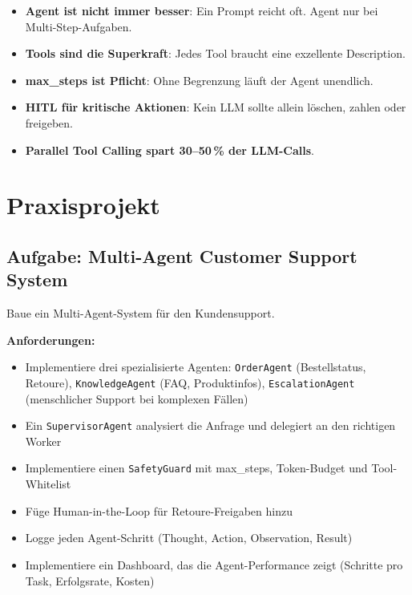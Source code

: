 


\par\mbox{}\par
\begin{merkeEnv}
\begin{itemize}
    \item \textbf{Agent ist nicht immer besser}: Ein Prompt reicht oft. Agent nur bei Multi-Step-Aufgaben.
    \item \textbf{Tools sind die Superkraft}: Jedes Tool braucht eine exzellente Description.
    \item \textbf{max\_steps ist Pflicht}: Ohne Begrenzung läuft der Agent unendlich.
    \item \textbf{HITL für kritische Aktionen}: Kein LLM sollte allein löschen, zahlen oder freigeben.
    \item \textbf{Parallel Tool Calling spart 30--50\,\% der LLM-Calls}.
\end{itemize}
\end{merkeEnv}

\section{Praxisprojekt}

\subsection{Aufgabe: Multi-Agent Customer Support System}

Baue ein Multi-Agent-System für den Kundensupport.

\textbf{Anforderungen:}
\begin{itemize}[leftmargin=*]
    \item Implementiere drei spezialisierte Agenten: \texttt{OrderAgent} (Bestellstatus, Retoure), \texttt{KnowledgeAgent} (FAQ, Produktinfos), \texttt{EscalationAgent} (menschlicher Support bei komplexen Fällen)
    \item Ein \texttt{SupervisorAgent} analysiert die Anfrage und delegiert an den richtigen Worker
    \item Implementiere einen \texttt{SafetyGuard} mit max\_steps, Token-Budget und Tool-Whitelist
    \item Füge Human-in-the-Loop für Retoure-Freigaben hinzu
    \item Logge jeden Agent-Schritt (Thought, Action, Observation, Result)
    \item Implementiere ein Dashboard, das die Agent-Performance zeigt (Schritte pro Task, Erfolgsrate, Kosten)
\end{itemize}

